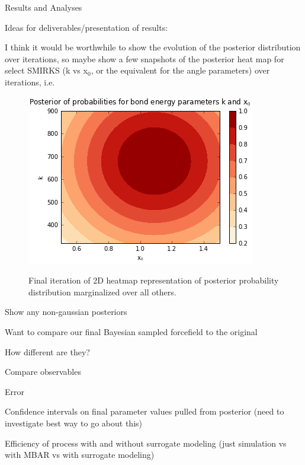 \documentclass{report}
\begin{document}
\begin{outline}
  \item{Results and Analyses}
  \begin{outline}
    \item{Ideas for deliverables/presentation of results:}
    \begin{outline}
      \item{I think it would be worthwhile to show the evolution of the posterior distribution over iterations, so maybe show a few snapshots of 
                the posterior heat map for select SMIRKS (k vs x$_0$, or the equivalent for the angle parameters) over iterations, i.e.  
      \begin{figure}[h!]
      \centering
  
      \includegraphics[width=.9\linewidth]{fake_post.PNG}
      \label{fig:sub1}
      \caption{Final iteration of 2D heatmap representation of posterior probability distribution marginalized over all others.}
      \end{figure}
      \item{Show any non-gaussian posteriors}
      \item{Want to compare our final Bayesian sampled forcefield to the original}
      \begin{outline}
        \item{How different are they?}
        \item{Compare observables}
        \item{Error}
        \item{Confidence intervals on final parameter values pulled from posterior (need to investigate best way to go about this)}
      \end{outline}
      \item{Efficiency of process with and without surrogate modeling (just simulation vs with MBAR vs with surrogate modeling)}
}
\end{outline}
\end{outline}
\end{outline}
\end{document}
